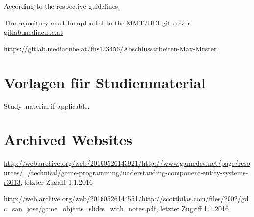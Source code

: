 \begin{appendices}
According to the respective guidelines.

The repository must be uploaded to the MMT/HCI git server {\url{gitlab.mediacube.at}}

{\color{red}\url{https://gitlab.mediacube.at/fhs123456/Abschlussarbeiten-Max-Muster}}
	
\section{Vorlagen für Studienmaterial}

Study material if applicable. 

\section{Archived Websites}
\sloppy
\url{http://web.archive.org/web/20160526143921/http://www.gamedev.net/page/resources/_/technical/game-programming/understanding-component-entity-systems-r3013}, letzter Zugriff 1.1.2016

\url{http://web.archive.org/web/20160526144551/http://scottbilas.com/files/2002/gdc_san_jose/game_objects_slides_with_notes.pdf}, letzter Zugriff 1.1.2016

\end{appendices}
